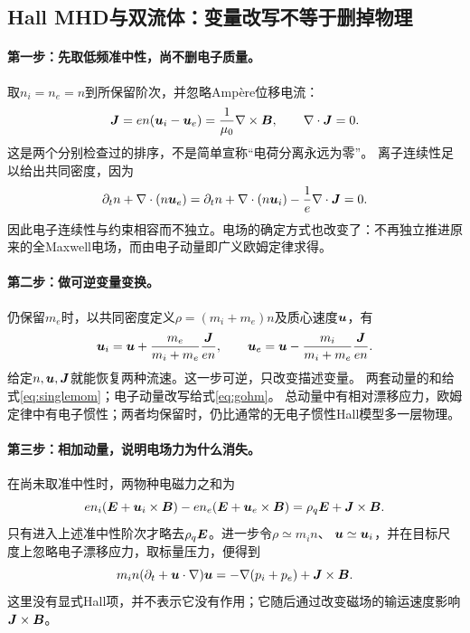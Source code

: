 \subsection{Hall MHD与双流体：变量改写不等于删掉物理}
\label{sec:twofluid-to-hall}

\paragraph{第一步：先取低频准中性，尚不删电子质量。}
取$n_i=n_e=n$到所保留阶次，并忽略Ampère位移电流：
\begin{equation}
 \bm{J}=en(\bm{u}_i-\bm{u}_e)=\frac1{\mu_0}\nabla\times\bm{B},\qquad
 \nabla\cdot\bm{J}=0.
\end{equation}
这是两个分别检查过的排序，不是简单宣称“电荷分离永远为零”。
离子连续性足以给出共同密度，因为
\begin{equation}
 \partial_tn+\nabla\cdot(n\bm{u}_e)
 =\partial_tn+\nabla\cdot(n\bm{u}_i)-\frac1e\nabla\cdot\bm{J}=0.
\end{equation}
因此电子连续性与约束相容而不独立。电场的确定方式也改变了：不再独立推进原来的全Maxwell电场，而由电子动量即广义欧姆定律求得。

\paragraph{第二步：做可逆变量变换。}
仍保留$m_e$时，以共同密度定义$\rho=(m_i+m_e)n$及质心速度$\bm{u}$，有
\begin{equation}
 \bm{u}_i=\bm{u}+\frac{m_e}{m_i+m_e}\frac{\bm{J}}{en},\qquad
 \bm{u}_e=\bm{u}-\frac{m_i}{m_i+m_e}\frac{\bm{J}}{en}.
\end{equation}
给定$n,\bm{u},\bm{J}$就能恢复两种流速。这一步可逆，只改变描述变量。
两套动量的和给式\eqref{eq:singlemom}；电子动量改写给式\eqref{eq:gohm}。
总动量中有相对漂移应力，欧姆定律中有电子惯性；两者均保留时，仍比通常的无电子惯性Hall模型多一层物理。

\paragraph{第三步：相加动量，说明电场力为什么消失。}
在尚未取准中性时，两物种电磁力之和为
\begin{equation}
 en_i(\bm{E}+\bm{u}_i\times\bm{B})-en_e(\bm{E}+\bm{u}_e\times\bm{B})
 =\rho_q\bm{E}+\bm{J}\times\bm{B}.
\end{equation}
只有进入上述准中性阶次才略去$\rho_q\bm{E}$。进一步令$\rho\simeq m_in$、
$\bm{u}\simeq\bm{u}_i$，并在目标尺度上忽略电子漂移应力，取标量压力，便得到
\begin{equation}
 m_in(\partial_t+\bm{u}\cdot\nabla)\bm{u}
 =-\nabla(p_i+p_e)+\bm{J}\times\bm{B}.
\end{equation}
这里没有显式Hall项，并不表示它没有作用；它随后通过改变磁场的输运速度影响$\bm{J}\times\bm{B}$。


